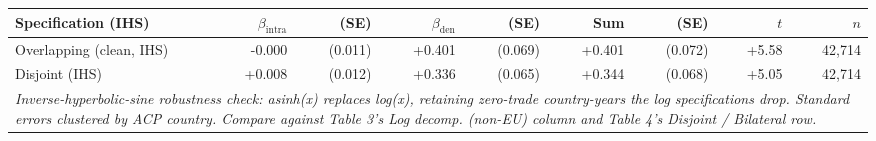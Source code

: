 \begin{tabular}{lrrrrrrrr}
\midrule\midrule
Specification (IHS) & $\beta_{\text{intra}}$ & (SE) & $\beta_{\text{den}}$ & (SE) & Sum & (SE) & $t$ & $n$ \\
\midrule
Overlapping (clean, IHS)  & -0.000 & (0.011) & +0.401 & (0.069) & +0.401 & (0.072) & +5.58 & 42,714 \\
Disjoint (IHS)            & +0.008 & (0.012) & +0.336 & (0.065) & +0.344 & (0.068) & +5.05 & 42,714 \\
\midrule\midrule
\multicolumn{9}{p{0.95\linewidth}}{\emph{Inverse-hyperbolic-sine robustness check: asinh(x) replaces log(x), retaining zero-trade country-years the log specifications drop. Standard errors clustered by ACP country. Compare against Table 3's Log decomp. (non-EU) column and Table 4's Disjoint / Bilateral row.}}\\
\end{tabular}
